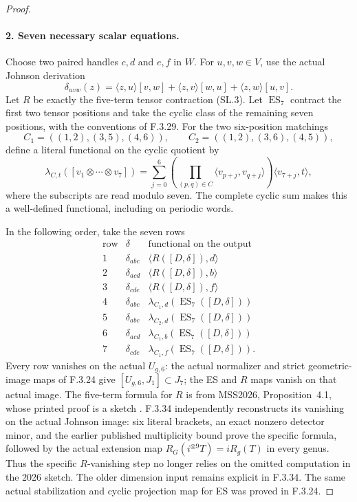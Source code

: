 \begin{proof}
\paragraph{2. Seven necessary scalar equations.}
Choose two paired handles $c,d$ and $e,f$ in $W$.
For $u,v,w\in V$, use the actual Johnson derivation
\[
 \delta_{uvw}(z)=\langle z,u\rangle[v,w]
              +\langle z,v\rangle[w,u]
              +\langle z,w\rangle[u,v].
\]
Let $R$ be exactly the five-term tensor contraction (SL.3).
Let $\operatorname{ES}_7$ contract the first two tensor
positions and take the cyclic class of the remaining seven
positions, with the conventions of F.3.29.
For the two six-position matchings
\[
 C_1=((1,2),(3,5),(4,6)),\qquad
 C_2=((1,2),(3,6),(4,5)),
\]
define a literal functional on the cyclic quotient by
\[
 \lambda_{C,t}([v_1\otimes\cdots\otimes v_7])
   =\sum_{j=0}^6
      \left(\prod_{(p,q)\in C}
         \langle v_{p+j},v_{q+j}\rangle\right)
         \langle v_{7+j},t\rangle,                         \tag{UC.3}
\]
where the subscripts are read modulo seven.
The complete cyclic sum makes this a well-defined
functional, including on periodic words.

In the following order, take the seven rows
\[
\begin{array}{c|c|c}
 \text{row}&\delta&\text{functional on the output}\\\hline
 1&\delta_{abc}&\langle R([D,\delta]),d\rangle\\
 2&\delta_{acd}&\langle R([D,\delta]),b\rangle\\
 3&\delta_{cde}&\langle R([D,\delta]),f\rangle\\
 4&\delta_{abc}&\lambda_{C_1,d}(\operatorname{ES}_7([D,\delta]))\\
 5&\delta_{abc}&\lambda_{C_2,d}(\operatorname{ES}_7([D,\delta]))\\
 6&\delta_{acd}&\lambda_{C_1,b}(\operatorname{ES}_7([D,\delta]))\\
 7&\delta_{cde}&\lambda_{C_1,f}(\operatorname{ES}_7([D,\delta])).
\end{array}                                                \tag{UC.4}
\]
Every row vanishes on the actual $U_{g,6}$: the actual
normalizer and strict geometric-image maps of F.3.24 give
$[U_{g,6},J_1]\subset J_7$; the ES and $R$ maps vanish
on that actual image. The five-term formula for $R$ is from MSS2026,
Proposition~4.1, whose printed proof is a sketch
\cite[pp.~10--11]{AuditMoritaSakasaiSuzuki2026v1}.
F.3.34 independently reconstructs its vanishing on the actual
Johnson image: six literal brackets, an exact nonzero detector
minor, and the earlier published multiplicity bound prove the
specific formula, followed by the actual extension map
$R_G(i^{\otimes9}T)=iR_g(T)$ in every genus.
Thus the specific $R$-vanishing step no longer relies on the
omitted computation in the 2026 sketch. The older dimension
input remains explicit in F.3.34. The same actual stabilization
and cyclic projection map for ES was proved in F.3.24.


\end{proof}
